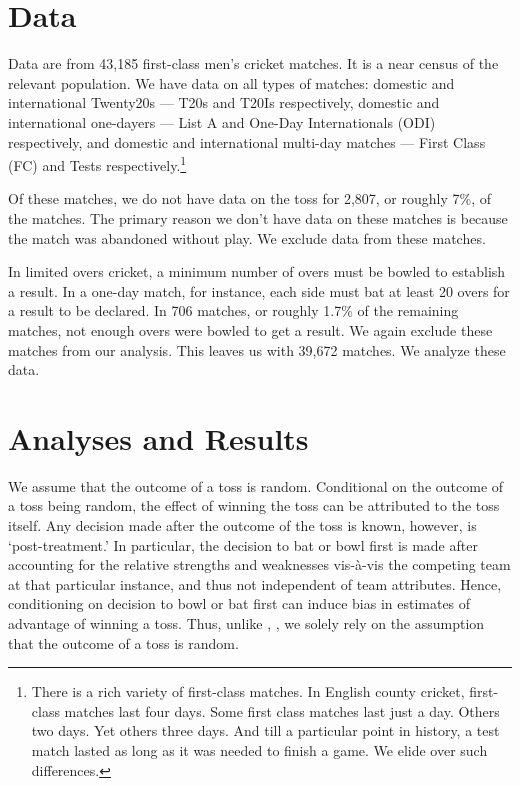 \documentclass[12pt]{article}
\begin{document}
\section*{Data}
Data are from 43,185 first-class men's cricket matches. It is a near census of the relevant population. We have data on all types of matches: domestic and international Twenty20s --- T20s and T20Is respectively, domestic and international one-dayers --- List A and One-Day Internationals (ODI) respectively, and domestic and international multi-day matches --- First Class (FC) and Tests respectively.\footnote{There is a rich variety of first-class matches. In English county cricket, first-class matches last four days. Some first class matches last just a day. Others two days. Yet others three days. And till a particular point in history, a test match lasted as long as it was needed to finish a game. We elide over such differences.} 

Of these matches, we do not have data on the toss for 2,807, or roughly 7\%, of the matches. The primary reason we don't have data on these matches is because the match was abandoned without play. We exclude data from these matches. 

In limited overs cricket, a minimum number of overs must be bowled to establish a result. In a one-day match, for instance, each side must bat at least 20 overs for a result to be declared. In 706 matches, or roughly 1.7\% of the remaining matches, not enough overs were bowled to get a result. We again exclude these matches from our analysis. This leaves us with 39,672 matches. We analyze these data.
 
\section*{Analyses and Results}

We assume that the outcome of a toss is random. Conditional on the outcome of a toss being random, the effect of winning the toss can be attributed to the toss itself. Any decision made after the outcome of the toss is known, however, is `post-treatment.' In particular, the decision to bat or bowl first is made after accounting for the relative strengths and weaknesses vis-\`{a}-vis the competing team at that particular instance, and thus not independent of team attributes. Hence, conditioning on decision to bowl or bat first can induce bias in estimates of advantage of winning a toss. Thus, unlike \citet{dawson2009bat}, \citet{Saad2015}, we solely rely on the assumption that the outcome of a toss is random. 
\end{document}
